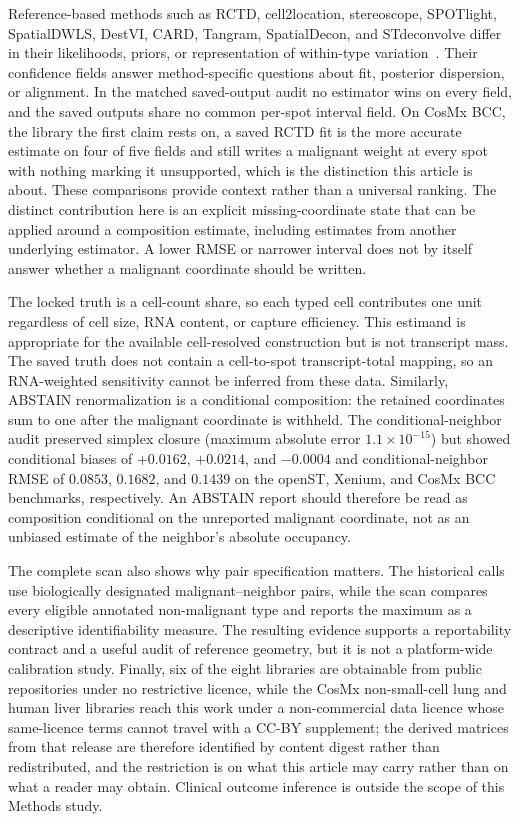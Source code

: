 Reference-based methods such as RCTD, cell2location, stereoscope, SPOTlight, SpatialDWLS, DestVI, CARD, Tangram, SpatialDecon, and STdeconvolve differ in their likelihoods, priors, or representation of within-type variation~\citep{Cable2022,Kleshchevnikov2022,Andersson2020,ElosuaBayes2021,Dong2021,Lopez2022,Ma2022,Biancalani2021,Danaher2022,Miller2022}. Their confidence fields answer method-specific questions about fit, posterior dispersion, or alignment. In the matched saved-output audit no estimator wins on every field, and the saved outputs share no common per-spot interval field. On CosMx BCC, the library the first claim rests on, a saved RCTD fit is the more accurate estimate on four of five fields and still writes a malignant weight at every spot with nothing marking it unsupported, which is the distinction this article is about. These comparisons provide context rather than a universal ranking. The distinct contribution here is an explicit missing-coordinate state that can be applied around a composition estimate, including estimates from another underlying estimator. A lower RMSE or narrower interval does not by itself answer whether a malignant coordinate should be written.

The locked truth is a cell-count share, so each typed cell contributes one unit regardless of cell size, RNA content, or capture efficiency. This estimand is appropriate for the available cell-resolved construction but is not transcript mass. The saved truth does not contain a cell-to-spot transcript-total mapping, so an RNA-weighted sensitivity cannot be inferred from these data. Similarly, ABSTAIN renormalization is a conditional composition: the retained coordinates sum to one after the malignant coordinate is withheld. The conditional-neighbor audit preserved simplex closure (maximum absolute error \(1.1\times10^{-15}\)) but showed conditional biases of \(+0.0162\), \(+0.0214\), and \(-0.0004\) and conditional-neighbor RMSE of \(0.0853\), \(0.1682\), and \(0.1439\) on the openST, Xenium, and CosMx BCC benchmarks, respectively. An ABSTAIN report should therefore be read as composition conditional on the unreported malignant coordinate, not as an unbiased estimate of the neighbor's absolute occupancy.

The complete scan also shows why pair specification matters. The historical calls use biologically designated malignant--neighbor pairs, while the scan compares every eligible annotated non-malignant type and reports the maximum as a descriptive identifiability measure. The resulting evidence supports a reportability contract and a useful audit of reference geometry, but it is not a platform-wide calibration study. Finally, six of the eight libraries are obtainable from public repositories under no restrictive licence, while the CosMx non-small-cell lung and human liver libraries reach this work under a non-commercial data licence whose same-licence terms cannot travel with a CC-BY supplement; the derived matrices from that release are therefore identified by content digest rather than redistributed, and the restriction is on what this article may carry rather than on what a reader may obtain. Clinical outcome inference is outside the scope of this Methods study.

